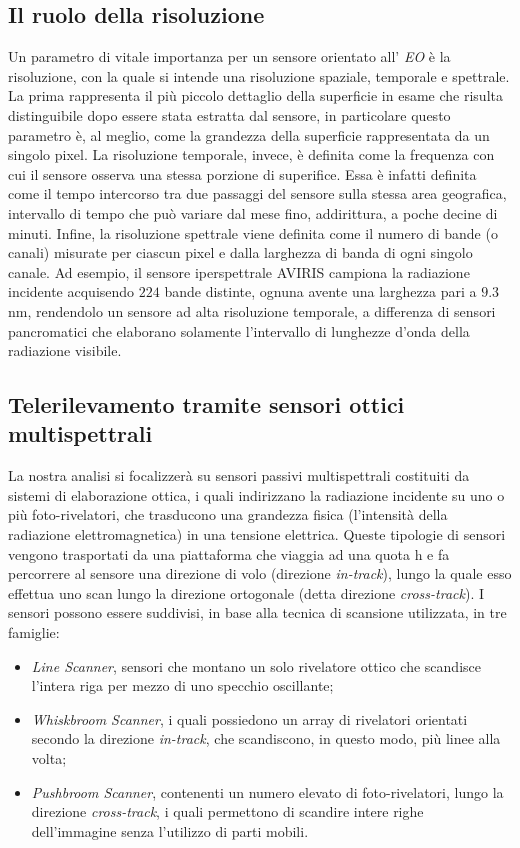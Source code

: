 \subsection{Il ruolo della risoluzione}
Un parametro di vitale importanza per un sensore orientato all' \emph{EO} è la risoluzione, con la quale si intende una risoluzione spaziale, temporale e spettrale.
La prima rappresenta il più piccolo dettaglio della superficie in esame che risulta distinguibile dopo essere stata estratta dal sensore, in particolare questo parametro è, al meglio, come la grandezza della superficie rappresentata da un singolo pixel.
La risoluzione temporale, invece, è definita come la frequenza con cui il sensore osserva una stessa porzione di superifice. 
Essa è infatti definita come il tempo intercorso tra due passaggi del sensore sulla stessa area geografica, intervallo di tempo che può variare dal mese fino, addirittura, a poche decine di minuti.
Infine, la risoluzione spettrale viene definita come il numero di bande (o canali) misurate per ciascun pixel e dalla larghezza di banda di ogni singolo canale. Ad esempio, il sensore iperspettrale AVIRIS campiona la radiazione incidente acquisendo $224$ bande distinte, ognuna avente una larghezza pari a $9.3$ nm, rendendolo un sensore ad alta risoluzione temporale, a differenza di sensori pancromatici che elaborano solamente l'intervallo di lunghezze d'onda della radiazione visibile.


\subsection{Telerilevamento tramite sensori ottici multispettrali}
La nostra analisi si focalizzerà su sensori passivi multispettrali costituiti da sistemi di elaborazione ottica, i quali indirizzano la radiazione incidente su uno o più foto-rivelatori, che trasducono una grandezza fisica (l'intensità della radiazione elettromagnetica) in una tensione elettrica. Queste tipologie di sensori vengono trasportati da una piattaforma che viaggia ad una quota h e fa percorrere al sensore una direzione di volo (direzione \emph{in-track}), lungo la quale esso effettua uno scan lungo la direzione ortogonale (detta direzione \emph{cross-track}).
I sensori possono essere suddivisi, in base alla tecnica di scansione utilizzata, in tre famiglie:

\begin{itemize}
\item \emph{Line Scanner}, sensori che montano un solo rivelatore ottico che scandisce l'intera riga per mezzo di uno specchio oscillante;
\item \emph{Whiskbroom Scanner}, i quali possiedono un array di rivelatori orientati secondo la direzione \emph{in-track}, che scandiscono, in questo modo, più linee alla volta; 
\item \emph{Pushbroom Scanner}, contenenti un numero elevato di foto-rivelatori, lungo la direzione \emph{cross-track}, i quali permettono di scandire intere righe dell'immagine senza l'utilizzo di parti mobili.
\end{itemize}

